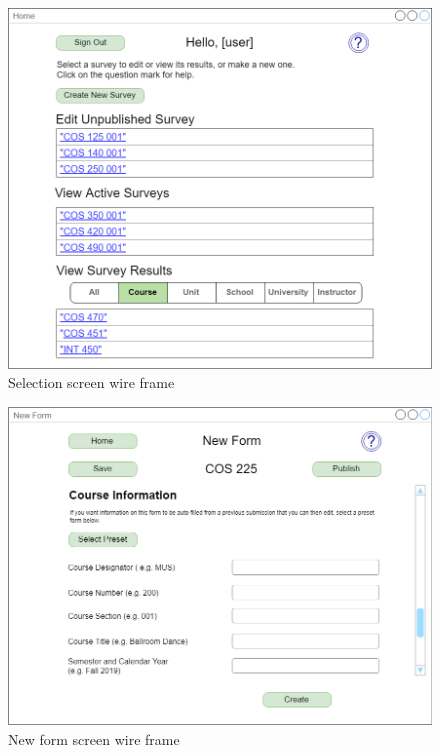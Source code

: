 \documentclass{article}
\begin{document}
\begin{center}
\begin{figure}
    \centering
    \includegraphics[scale=.3]{images/selection_screen.png}
    \caption{Selection screen wire frame}
    \label{fig:my_label}
\end{figure}
\end{center}

\begin{center}
\begin{figure}
    \centering
    \includegraphics[scale=.3]{images/new_form_screen.png}
    \caption{New form screen wire frame}
    \label{fig:my_label}
\end{figure}
\end{center}
\end{document}
